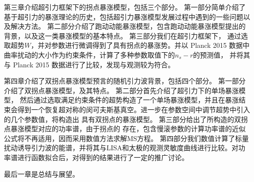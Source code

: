 第三章介绍超引力框架下的拐点暴涨模型，包括三个部分。
第一部分简单介绍了基于超引力的暴涨理论的历史，包括超引力暴涨模型发展过程中遇到的一些问题以及解决方法。
第二部分介绍了跑动动能暴涨模型，包含跑动动能暴涨模型提出的背景，以及这一类暴涨模型的基本特点。
第三部分我们在超引力框架下，
通过选取超势$W$，并对参数进行微调得到了具有拐点的暴涨势。并以
Planck 2015
数据中曲率扰动的大小作为约束条件，计算了多种参数取值下的$n_{s}-r$的预测值，
并将其与 Planck 2015 数据进行了比较，发现与观测较为符合。

第四章介绍了双拐点暴涨模型预言的随机引力波背景，包括四个部分。
第一部分介绍了双拐点暴涨模型，及其特点。
第二部分首先介绍了超引力下的单场暴涨模型，
然后通过选取满足约束条件的超势构造了一个单场暴涨模型，并且在暴涨结束会得到一个恢复超对称的闵可夫斯基真空。进一步在参数空间中调节超势中引入的几个参数值，将构造出
具有双拐点的暴涨模型。
第三部分给出了所构造的双拐点暴涨模型对应的功率谱，由于拐点的
存在，包含慢滚参数的计算功率谱的近似公式将不再适用，因而采用数值方法求解MS方程。
第四部分我们数值计算了标量扰动诱导引力波的能谱，并将其与LISA\citep{amaro2017laser}和太极\citep{guo2018taiji}的观测灵敏度曲线进行比较。对功率谱进行函数拟合后，对得到的结果进行了一定的推广讨论。

最后一章是总结与展望。
